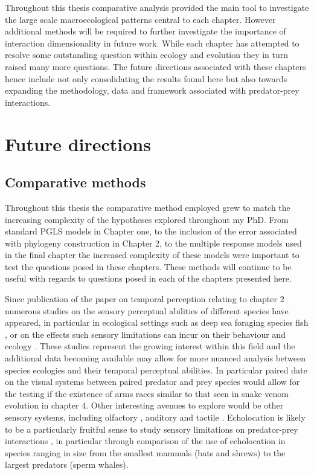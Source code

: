Throughout this thesis comparative analysis provided the main tool to investigate the large scale macroecological patterns central to each chapter. However additional methods will be required to further investigate the importance of interaction dimensionality in future work. While each chapter has attempted to resolve some outstanding question within ecology and evolution they in turn raised many more questions. The future directions associated with these chapters hence include not only consolidating the results found here but also towards expanding the methodology, data and framework associated with predator-prey interactions.


\section{\uppercase{F}uture directions}

\subsection{Comparative methods}


Throughout this thesis the comparative method employed grew to match the increasing complexity of the hypotheses explored throughout my PhD. From standard PGLS models in Chapter one, to the inclusion of the error associated with phylogeny construction in Chapter 2, to the multiple response models used in the final chapter the increased complexity of these models were important to test the questions posed in these chapters. These methods will continue to be useful with regards to questions posed in each of the chapters presented here. 

Since publication of the paper on temporal perception relating to chapter 2 \citep{healy2013metabolic} numerous studies on the sensory perceptual abilities of different species have appeared, in particular in ecological settings such as deep sea foraging species fish \citep{kalinoski2014spectral,Wegner15052015,landgren2014visual}, or on the effects such sensory limitations can incur on their behaviour and ecology \citep{bar2015sensory,inger2014potential}. These studies represent the growing interest within this field and the additional data becoming available may allow for more nuanced analysis between species ecologies and their temporal perceptual abilities. In particular paired date on the visual systems between paired predator and prey species would allow for the testing if the existence of arms races similar to that seen in snake venom evolution in chapter 4. Other interesting avenues to explore would be other sensory systems, including olfactory \citep{uchida2003speed}, auditory \citep{bar2015sensory} and tactile \citep{braam2005touch}. Echolocation is likely to be a particularly fruitful sense to study sensory limitations on predator-prey interactions \citep{bar2015sensory}, in particular through comparison of the use of echolocation in species ranging in size from the smallest mammals (bats and shrews) to the largest predators (sperm whales).


